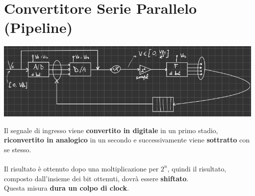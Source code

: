 \section{Convertitore Serie Parallelo (Pipeline)}
\begin{center}
    \includegraphics[width=\textwidth]{Images/figure39.png}
\end{center}
Il segnale di ingresso viene \textbf{convertito in digitale} in un primo stadio, \textbf{riconvertito in analogico} in un secondo e successivamente viene \textbf{sottratto} con se stesso.\\ \\
Il risultato è ottenuto dopo una moltiplicazione per $2^n$, quindi il risultato, composto dall'insieme dei bit ottenuti, dovrà essere \textbf{shiftato}.\\ 
Questa misura \textbf{dura un colpo di clock}.
